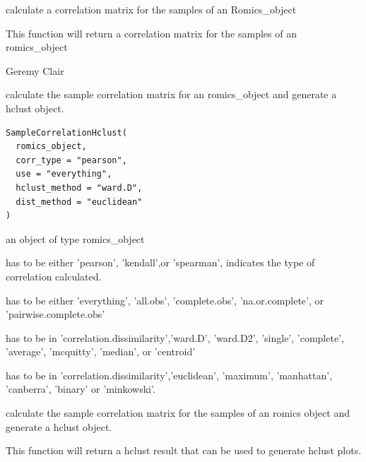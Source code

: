\documentclass[a4paper]{book}
\begin{document}
%
\begin{Details}
calculate a correlation matrix for the samples of an Romics\_object
\end{Details}
%
\begin{Value}
This function will return a correlation matrix for the samples of an romics\_object
\end{Value}
%
\begin{Author}
Geremy Clair
\end{Author}
%
\begin{Description}
calculate the sample correlation matrix for an romics\_object and generate a hclust object.
\end{Description}
%
\begin{Usage}
\begin{verbatim}
SampleCorrelationHclust(
  romics_object,
  corr_type = "pearson",
  use = "everything",
  hclust_method = "ward.D",
  dist_method = "euclidean"
)
\end{verbatim}
\end{Usage}
%
\begin{Arguments}
\begin{ldescription}
\item[\code{romics\_object}] an object of type romics\_object

\item[\code{corr\_type}] has to be either 'pearson', 'kendall',or 'spearman', indicates the type of correlation calculated.

\item[\code{use}] has to be either 'everything', 'all.obs', 'complete.obs', 'na.or.complete', or 'pairwise.complete.obs'

\item[\code{hclust\_method}] has to be in 'correlation.dissimilarity','ward.D', 'ward.D2', 'single', 'complete', 'average', 'mcquitty', 'median', or 'centroid'

\item[\code{dist\_method}] has to be in 'correlation.dissimilarity','euclidean', 'maximum', 'manhattan', 'canberra', 'binary' or 'minkowski'.
\end{ldescription}
\end{Arguments}
%
\begin{Details}
calculate the sample correlation matrix for the samples of an romics object and generate a hclust object.
\end{Details}
%
\begin{Value}
This function will return a hclust result that can be used to generate hclust plots.
\end{Value}
\end{document}

